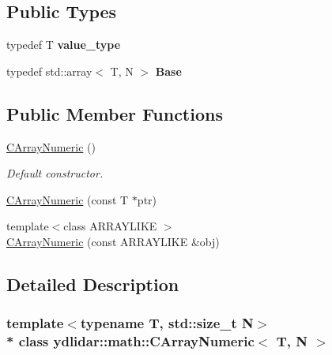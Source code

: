 \subsection*{Public Types}
\begin{DoxyCompactItemize}
\item 
typedef T {\bfseries value\+\_\+type}\hypertarget{classydlidar_1_1math_1_1_c_array_numeric_a2edaba56fdab59906376fdf1f67b390d}{}\label{classydlidar_1_1math_1_1_c_array_numeric_a2edaba56fdab59906376fdf1f67b390d}

\item 
typedef std\+::array$<$ T, N $>$ {\bfseries Base}\hypertarget{classydlidar_1_1math_1_1_c_array_numeric_a20f9963126014b64bc545814115de51c}{}\label{classydlidar_1_1math_1_1_c_array_numeric_a20f9963126014b64bc545814115de51c}

\end{DoxyCompactItemize}
\subsection*{Public Member Functions}
\begin{DoxyCompactItemize}
\item 
\hyperlink{classydlidar_1_1math_1_1_c_array_numeric_a3866d69effe6e4b40a367eea349aafbe}{C\+Array\+Numeric} ()\hypertarget{classydlidar_1_1math_1_1_c_array_numeric_a3866d69effe6e4b40a367eea349aafbe}{}\label{classydlidar_1_1math_1_1_c_array_numeric_a3866d69effe6e4b40a367eea349aafbe}

\begin{DoxyCompactList}\small\item\em Default constructor. \end{DoxyCompactList}\item 
\hyperlink{classydlidar_1_1math_1_1_c_array_numeric_a6e18b54e7fbd8aee014b4de2ed49a1b6}{C\+Array\+Numeric} (const T $\ast$ptr)
\item 
{\footnotesize template$<$class A\+R\+R\+A\+Y\+L\+I\+KE $>$ }\\\hyperlink{classydlidar_1_1math_1_1_c_array_numeric_a0bdbaec16dc3881278dc50d7d8a5cb3a}{C\+Array\+Numeric} (const A\+R\+R\+A\+Y\+L\+I\+KE \&obj)
\end{DoxyCompactItemize}


\subsection{Detailed Description}
\subsubsection*{template$<$typename T, std\+::size\+\_\+t N$>$\\*
class ydlidar\+::math\+::\+C\+Array\+Numeric$<$ T, N $>$}

